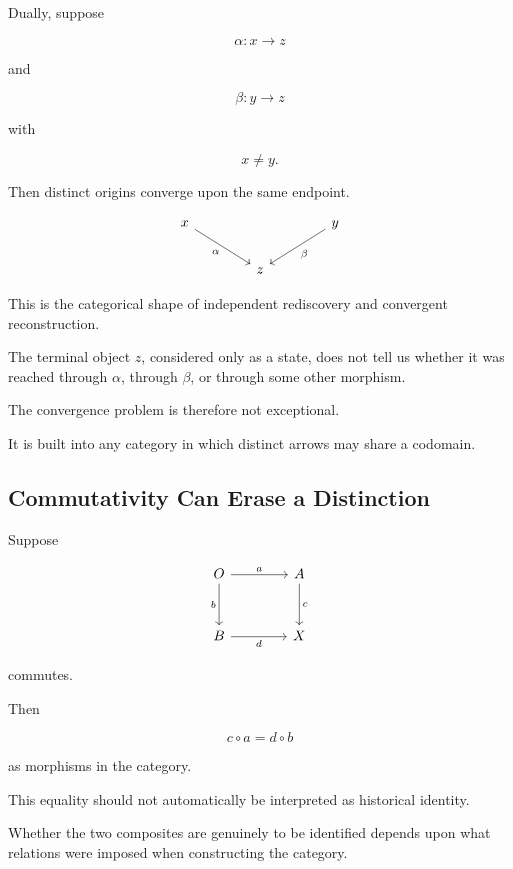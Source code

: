 \documentclass[
  11pt,
  a4paper,
  DIV=12,
  BCOR=0mm,
  parskip=half-
]{scrartcl}
\theoremstyle{definition}
\theoremstyle{plain}
\theoremstyle{remark}
\begin{document}
Dually, suppose

\[
  \alpha:x\to z
\]

and

\[
  \beta:y\to z
\]

with

\[
  x\neq y.
\]

Then distinct origins converge upon the same endpoint.

\[
\begin{tikzcd}[column sep=4em,row sep=2em]
x \arrow[dr,"\alpha"'] && y \arrow[dl,"\beta"] \\
& z &
\end{tikzcd}
\]

This is the categorical shape of independent rediscovery and convergent
reconstruction.

The terminal object \(z\), considered only as a state, does not tell us
whether it was reached through \(\alpha\), through \(\beta\), or through some
other morphism.

The convergence problem is therefore not exceptional.

It is built into any category in which distinct arrows may share a codomain.


\subsection{Commutativity Can Erase a Distinction}
\label{app:commuting-histories}

Suppose

\[
\begin{tikzcd}[column sep=4em,row sep=3em]
O \arrow[r,"a"] \arrow[d,"b"'] &
A \arrow[d,"c"] \\
B \arrow[r,"d"'] &
X
\end{tikzcd}
\]

commutes.

Then

\[
  c\circ a
  =
  d\circ b
\]

as morphisms in the category.

This equality should not automatically be interpreted as historical identity.

Whether the two composites are genuinely to be identified depends upon what
relations were imposed when constructing the category.
\end{document}
